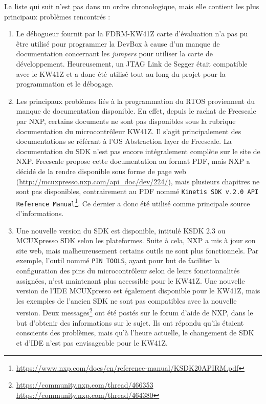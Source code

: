 La liste qui suit n'est pas dans un ordre chronologique, mais elle contient les plus principaux problèmes rencontrés : 
\begin{enumerate}
    \item Le débogueur fournit par la FDRM-KW41Z carte d'évaluation n'a pas pu être utilisé pour programmer la DevBox à cause d'un manque de documentation concernant les \textit{jumpers} pour utiliser la carte de développement. Heureusement, un JTAG Link de Segger était compatible avec le KW41Z et a donc été utilisé tout au long du projet pour la programmation et le débogage.
    
    \item Les principaux problèmes liés à la programmation du RTOS proviennent du manque de documentation disponible. En effet, depuis le rachat de Freescale par NXP, certains documents ne sont pas disponibles sous la rubrique documentation du microcontrôleur KW41Z. Il s'agit principalement des documentations se référant à l’OS Abstraction layer de Freescale. La documentation du SDK n'est pas encore intégralement complète sur le site de NXP. Freescale propose cette documentation au format PDF, mais NXP a décidé de la rendre disponible sous forme de page web (\url{http://mcuxpresso.nxp.com/api_doc/dev/224/}), mais plusieurs chapitres ne sont pas disponibles, contrairement au PDF nommé \texttt{Kinetis SDK v.2.0 API Reference Manual}\footnote{\url{https://www.nxp.com/docs/en/reference-manual/KSDK20APIRM.pdf}}. Ce dernier a donc été utilisé comme principale source d'informations.
    
    
    \item Une nouvelle version du SDK est disponible, intitulé KSDK 2.3 ou MCUXpresso SDK selon les plateformes. Suite à cela, NXP a mis à jour son site web, mais malheureusement certains outils ne sont plus fonctionnels. Par exemple, l'outil nommé \texttt{PIN TOOLS}, ayant pour but de faciliter la configuration des pins du microcontrôleur selon de leurs fonctionnalités assignées, n'est maintenant plus accessible pour le KW41Z. Une nouvelle version de l'IDE MCUXpresso est également disponible pour le KW41Z, mais les exemples de l'ancien SDK ne sont pas compatibles avec la nouvelle version. Deux messages\footnote{\url{https://community.nxp.com/thread/466353} \url{https://community.nxp.com/thread/464380}} ont été postés sur le forum d'aide de NXP, dans le but d'obtenir des informations sur le sujet. Ils ont répondu qu'ils étaient conscients des problèmes, mais qu'à l'heure actuelle, le changement de SDK et d'IDE n'est pas envisageable pour le KW41Z.
    

\end{enumerate}
